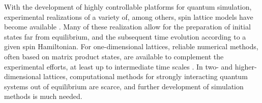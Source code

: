 \documentclass[aps,prl,showpacs,amsmath,amssymb,superscriptaddress,reprint,10pt]{revtex4-1}
\begin{document}
\begin{bibunit}
With the development of highly controllable platforms for quantum simulation, experimental realizations of a variety of, among others, spin lattice models have become available \cite{Simon_etal11,*Struck_etal11,*Labuhn,Britton_etal12,Schauss_etal12,*Islam_etal13,*dePaz_etal13,*Yan_etal13,*Jurcevic_etal14,*Richerme_etal14}. Many of these realization allow for the preparation of initial states far from equilibrium, and the subsequent time evolution according to a given spin Hamiltonian. For one-dimensional lattices, reliable numerical methods, often based on matrix product states, are available to complement the experimental efforts, at least up to intermediate time scales \cite{Schollwoeck11}. In two- and higher-dimensional lattices, computational methods for strongly interacting quantum systems out of equilibrium are scarce, and further development of simulation methods is much needed.


\end{bibunit}
\end{document}
